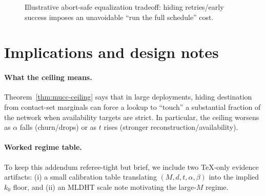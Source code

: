 \documentclass[11pt]{article}
\begin{document}
\begin{figure}[t]
  \centering
  \caption{Illustrative abort-safe equalization tradeoff: hiding retries/early success imposes an unavoidable ``run the full schedule'' cost.}
  \label{fig:abort-eq}
\end{figure}


\section{Implications and design notes}
\label{sec:implications}

\paragraph{What the ceiling means.}
Theorem~\ref{thm:mucc-ceiling} says that in large deployments, hiding destination from contact-set marginals can force a lookup to ``touch'' a substantial fraction of the network when availability targets are strict.
In particular, the ceiling worsens as $\alpha$ falls (churn/drops) or as $t$ rises (stronger reconstruction/availability).

\paragraph{Worked regime table.}
To keep this addendum referee-tight but brief, we include two TeX-only evidence artifacts:
(i) a small calibration table translating $(M,d,t,\alpha,\beta)$ into the implied $k_0$ floor,
and (ii) an MLDHT scale note motivating the large-$M$ regime.
\end{document}
